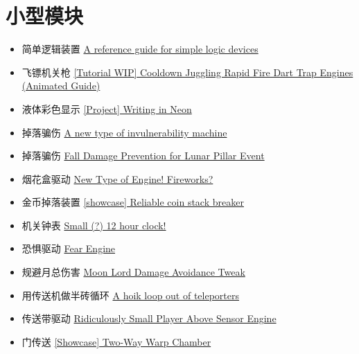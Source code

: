 \section{小型模块}
\begin{itemize}
\item 简单逻辑装置 \href{https://forums.terraria.org/index.php?threads/a-reference-guide-for-simple-logic-devices.81751/}{A reference guide for simple logic devices}
\item 飞镖机关枪 \href{https://forums.terraria.org/index.php?threads/tutorial-wip-cooldown-juggling-rapid-fire-dart-trap-engines-animated-guide.75871/}{[Tutorial WIP] Cooldown Juggling Rapid Fire Dart Trap Engines (Animated Guide)}
\item 液体彩色显示 \href{https://forums.terraria.org/index.php?threads/project-writing-in-neon.76053/}{[Project] Writing in Neon}
\item 掉落骗伤 \href{https://forums.terraria.org/index.php?threads/a-new-type-of-invulnerability-machine.76319/}{A new type of invulnerability machine}
\item 掉落骗伤 \href{https://forums.terraria.org/index.php?threads/fall-damage-prevention-for-lunar-pillar-event.76355/}{Fall Damage Prevention for Lunar Pillar Event}
\item 烟花盒驱动 \href{https://forums.terraria.org/index.php?threads/new-type-of-engine-fireworks.75788/}{New Type of Engine! Fireworks?}
\item 金币掉落装置 \href{https://forums.terraria.org/index.php?threads/showcase-reliable-coin-stack-breaker.75807/}{[showcase] Reliable coin stack breaker}
\item 机关钟表 \href{https://forums.terraria.org/index.php?threads/small-12-hour-clock.75810/}{Small (?) 12 hour clock!}
\item 恐惧驱动 \href{https://forums.terraria.org/index.php?threads/fear-engine.75835/}{Fear Engine}
\item 规避月总伤害 \href{https://forums.terraria.org/index.php?threads/moon-lord-damage-avoidance-tweak.75838/}{Moon Lord Damage Avoidance Tweak}
\item 用传送机做半砖循环 \href{https://forums.terraria.org/index.php?threads/a-hoik-loop-out-of-teleporters.75983/}{A hoik loop out of teleporters}
\item 传送带驱动 \href{https://forums.terraria.org/index.php?threads/ridiculously-small-player-above-sensor-engine.76326/}{Ridiculously Small Player Above Sensor Engine}
\item 门传送 \href{https://forums.terraria.org/index.php?threads/showcase-two-way-warp-chamber.76343/}{[Showcase] Two-Way Warp Chamber}

\end{itemize}
